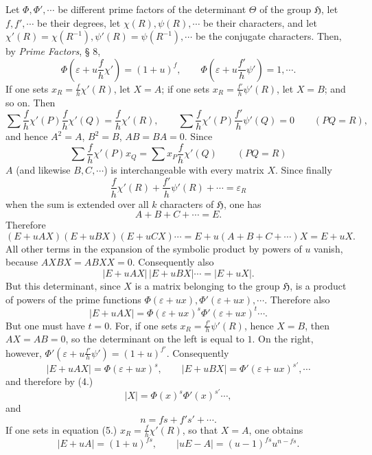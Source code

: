 \documentclass[11pt]{article}
\newcommand{\Hgr}{\mathfrak{H}}
\newcommand{\eps}{\varepsilon}
\begin{document}
Let $\Phi,\Phi',\cdots$ be different prime factors of the determinant $\Theta$ of the group $\Hgr$, let $f,f',\cdots$ be their degrees, let $\chi(R),\psi(R),\cdots$ be their characters, and let $\chi'(R)=\chi(R^{-1}),\psi'(R)=\psi(R^{-1}),\cdots$ be the conjugate characters. Then, by \emph{Prime Factors}, § 8,
\begin{equation}\tag{2.}
\Phi\!\left(\eps+u\frac{f}{h}\chi'\right)=(1+u)^f,
\qquad
\Phi\!\left(\eps+u\frac{f'}{h}\psi'\right)=1,\cdots .
\end{equation}
If one sets $x_R=\frac{f}{h}\chi'(R)$, let $X=A$; if one sets $x_R=\frac{f'}{h}\psi'(R)$, let $X=B$; and so on. Then
\[
\sum \frac{f}{h}\chi'(P)\frac{f}{h}\chi'(Q)=\frac{f}{h}\chi'(R),
\qquad
\sum \frac{f}{h}\chi'(P)\frac{f'}{h}\psi'(Q)=0\qquad(PQ=R),
\]
and hence $A^2=A$, $B^2=B$, $AB=BA=0$. Since
\[
\sum \frac{f}{h}\chi'(P)x_Q=\sum x_P\frac{f}{h}\chi'(Q)\qquad(PQ=R)
\]
$A$ (and likewise $B,C,\cdots$) is interchangeable with every matrix $X$. Since finally
\[
\frac{f}{h}\chi'(R)+\frac{f'}{h}\psi'(R)+\cdots=\eps_R
\]
when the sum is extended over all $k$ characters of $\Hgr$, one has
\begin{equation}\tag{3.}
A+B+C+\cdots=E.
\end{equation}
Therefore
\[
(E+uAX)(E+uBX)(E+uCX)\cdots=E+u(A+B+C+\cdots)X=E+uX.
\]
All other terms in the expansion of the symbolic product by powers of $u$ vanish, because $AXBX=ABXX=0$. Consequently also
\begin{equation}\tag{4.}
|E+uAX|\,|E+uBX|\cdots=|E+uX|.
\end{equation}
But this determinant, since $X$ is a matrix belonging to the group $\Hgr$, is a product of powers of the prime functions $\Phi(\eps+ux),\Phi'(\eps+ux),\cdots$. Therefore also
\[
|E+uAX|=\Phi(\eps+ux)^s\Phi'(\eps+ux)^t\cdots.
\]
But one must have $t=0$. For, if one sets $x_R=\frac{f'}{h}\psi'(R)$, hence $X=B$, then $AX=AB=0$, so the determinant on the left is equal to $1$. On the right, however, $\Phi'(\eps+u\frac{f'}{h}\psi')=(1+u)^{f'}$. Consequently
\begin{equation}\tag{5.}
|E+uAX|=\Phi(\eps+ux)^s,
\qquad
|E+uBX|=\Phi'(\eps+ux)^{s'},\cdots
\end{equation}
and therefore by (4.)
\begin{equation}\tag{6.}
|X|=\Phi(x)^s\Phi'(x)^{s'}\cdots,
\end{equation}
and
\[
n=fs+f's'+\cdots.
\]
If one sets in equation (5.) $x_R=\frac{f}{h}\chi'(R)$, so that $X=A$, one obtains
\begin{equation}\tag{7.}
|E+uA|=(1+u)^{fs},
\qquad |uE-A|=(u-1)^{fs}u^{n-fs}.
\end{equation}
\end{document}
